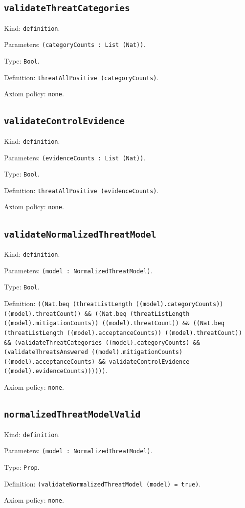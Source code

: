 \documentclass[11pt]{article}
\begin{document}
\subsection*{\texttt{validateThreatCategories}}
\noindent Kind: \texttt{definition}.\par
\noindent Parameters: \texttt{(categoryCounts : List (Nat))}.\par
\noindent Type: \texttt{Bool}.\par
\noindent Definition: \texttt{threatAllPositive (categoryCounts)}.\par
\noindent Axiom policy: \texttt{none}.\par
\subsection*{\texttt{validateControlEvidence}}
\noindent Kind: \texttt{definition}.\par
\noindent Parameters: \texttt{(evidenceCounts : List (Nat))}.\par
\noindent Type: \texttt{Bool}.\par
\noindent Definition: \texttt{threatAllPositive (evidenceCounts)}.\par
\noindent Axiom policy: \texttt{none}.\par
\subsection*{\texttt{validateNormalizedThreatModel}}
\noindent Kind: \texttt{definition}.\par
\noindent Parameters: \texttt{(model : NormalizedThreatModel)}.\par
\noindent Type: \texttt{Bool}.\par
\noindent Definition: \texttt{((Nat.beq (threatListLength ((model).categoryCounts)) ((model).threatCount)) \&\& ((Nat.beq (threatListLength ((model).mitigationCounts)) ((model).threatCount)) \&\& ((Nat.beq (threatListLength ((model).acceptanceCounts)) ((model).threatCount)) \&\& (validateThreatCategories ((model).categoryCounts) \&\& (validateThreatsAnswered ((model).mitigationCounts) ((model).acceptanceCounts) \&\& validateControlEvidence ((model).evidenceCounts))))))}.\par
\noindent Axiom policy: \texttt{none}.\par
\subsection*{\texttt{normalizedThreatModelValid}}
\noindent Kind: \texttt{definition}.\par
\noindent Parameters: \texttt{(model : NormalizedThreatModel)}.\par
\noindent Type: \texttt{Prop}.\par
\noindent Definition: \texttt{(validateNormalizedThreatModel (model) = true)}.\par
\noindent Axiom policy: \texttt{none}.\par
\end{document}
